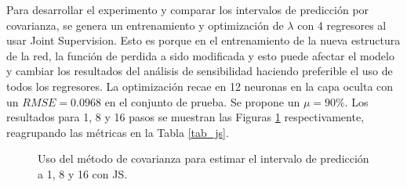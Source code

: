 \documentclass[12pt]{article}
\begin{document}
Para desarrollar el experimento y comparar los intervalos de predicción por covarianza, se genera un entrenamiento y optimización de $\lambda$ con 4 regresores al usar Joint Supervision. Esto es porque en el entrenamiento de la nueva estructura de la red, la función de perdida a sido modificada y esto puede afectar el modelo y cambiar los resultados del análisis de sensibilidad haciendo preferible el uso de todos los regresores. La optimización recae en 12 neuronas en la capa oculta con un $RMSE = 0.0968$ en el conjunto de prueba. Se propone un $\mu=90\%$. Los resultados para 1, 8 y 16 pasos se muestran las Figuras \ref{js_4} respectivamente, reagrupando las métricas en la Tabla \ref{tab_js}.

\begin{figure}[h!]
	\centering
	\captionsetup{justification=centering}
	 \newline
	\caption{Uso del método de covarianza para estimar el intervalo de predicción a 1, 8 y 16 con JS.}
	\label{js_4}
\end{figure}
\end{document}
